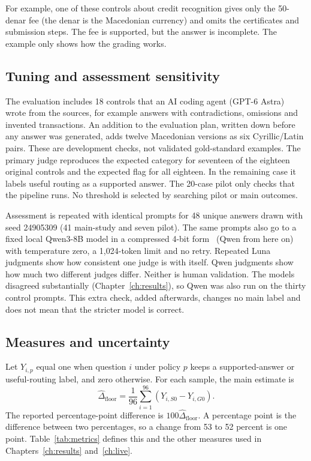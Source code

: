 For example, one of these controls about credit recognition gives only the 50-denar fee (the denar is the Macedonian currency) and omits the certificates and submission steps. The fee is supported, but the answer is incomplete. The example only shows how the grading works.

\subsection{Tuning and assessment sensitivity}

The evaluation includes 18 controls that an AI coding agent (GPT-6 Astra) wrote from the sources, for example answers with contradictions, omissions and invented transactions. An addition to the evaluation plan, written down before any answer was generated, adds twelve Macedonian versions as six Cyrillic/Latin pairs. These are development checks, not validated gold-standard examples. The primary judge reproduces the expected category for seventeen of the eighteen original controls and the expected flag for all eighteen. In the remaining case it labels useful routing as a supported answer. The 20-case pilot only checks that the pipeline runs. No threshold is selected by searching pilot or main outcomes.

Assessment is repeated with identical prompts for 48 unique answers drawn with seed 24905309 (41 main-study and seven pilot). The same prompts also go to a fixed local Qwen3-8B model in a compressed 4-bit form~\cite{yang2025qwen3} (Qwen from here on) with temperature zero, a 1,024-token limit and no retry. Repeated Luna judgments show how consistent one judge is with itself. Qwen judgments show how much two different judges differ. Neither is human validation. The models disagreed substantially (Chapter~\ref{ch:results}), so Qwen was also run on the thirty control prompts. This extra check, added afterwards, changes no main label and does not mean that the stricter model is correct.

\subsection{Measures and uncertainty}

Let $Y_{i,p}$ equal one when question $i$ under policy $p$ keeps a supported-answer or useful-routing label, and zero otherwise. For each sample, the main estimate is
\begin{equation}
\widehat{\Delta}_{\mathrm{floor}}=\frac{1}{96}\sum_{i=1}^{96}\left(Y_{i,S0}-Y_{i,G0}\right).
\label{eq:thesis-primary}
\end{equation}
The reported percentage-point difference is $100\widehat{\Delta}_{\mathrm{floor}}$. A percentage point is the difference between two percentages, so a change from 53 to 52 percent is one point. Table~\ref{tab:metrics} defines this and the other measures used in Chapters~\ref{ch:results} and~\ref{ch:live}.

